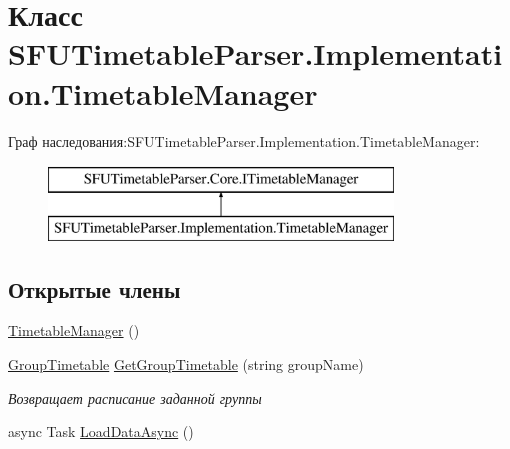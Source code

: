\hypertarget{class_s_f_u_timetable_parser_1_1_implementation_1_1_timetable_manager}{}\section{Класс S\+F\+U\+Timetable\+Parser.\+Implementation.\+Timetable\+Manager}
\label{class_s_f_u_timetable_parser_1_1_implementation_1_1_timetable_manager}
Граф наследования\+:S\+F\+U\+Timetable\+Parser.\+Implementation.\+Timetable\+Manager\+:\begin{figure}[H]
\begin{center}
\leavevmode
\includegraphics[height=2.000000cm]{class_s_f_u_timetable_parser_1_1_implementation_1_1_timetable_manager}
\end{center}
\end{figure}
\subsection*{Открытые члены}
\begin{DoxyCompactItemize}
\item 
\hyperlink{class_s_f_u_timetable_parser_1_1_implementation_1_1_timetable_manager_adc6225553917e6907461c1e127084dcb}{Timetable\+Manager} ()
\item 
\hyperlink{class_s_f_u_timetable_parser_1_1_core_1_1_entities_1_1_group_timetable}{Group\+Timetable} \hyperlink{class_s_f_u_timetable_parser_1_1_implementation_1_1_timetable_manager_a23e17cd28ece08c67288e569380c9602}{Get\+Group\+Timetable} (string group\+Name)
\begin{DoxyCompactList}\small\item\em Возвращает расписание заданной группы \end{DoxyCompactList}\item 
async Task \hyperlink{class_s_f_u_timetable_parser_1_1_implementation_1_1_timetable_manager_a68266c332dfb29c133aaa36afd29385f}{Load\+Data\+Async} ()
\end{DoxyCompactItemize}

